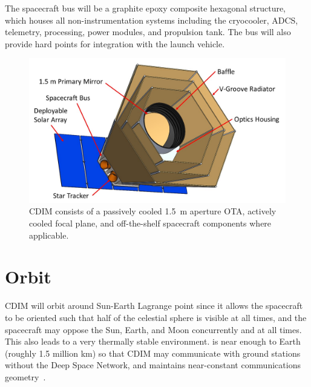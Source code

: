 \documentclass{ws-jai}
\begin{document}
The spacecraft bus will be a graphite epoxy composite hexagonal structure, which houses all non-instrumentation systems including the cryocooler, ADCS, telemetry, processing, power modules, and propulsion tank.
The bus will also provide hard points for integration with the launch vehicle.


\begin{figure}[htp]
  \includegraphics[width=\linewidth]{figs/cdim_annotated-cartoon}
  \caption{CDIM consists of a passively cooled \SI{1.5}{\meter} aperture OTA, actively cooled focal plane, and off-the-shelf spacecraft components where applicable. }
\label{fig:cdim-annotated}
\end{figure}

\section{Orbit}
\label{sec:orbit}
CDIM will orbit around Sun-Earth Lagrange point \Ltwo{} since it allows the spacecraft to be oriented such that half of the celestial sphere is visible at all times, and the spacecraft may oppose the Sun, Earth, and Moon concurrently and at all times.
This also leads to a very thermally stable environment.
\Ltwo{} is near enough to Earth (roughly 1.5 million \si{\kilo\meter}) so that CDIM may communicate with ground stations without the Deep Space Network, and maintains near-constant communications geometry~\cite{canalias2004}.
\end{document}
